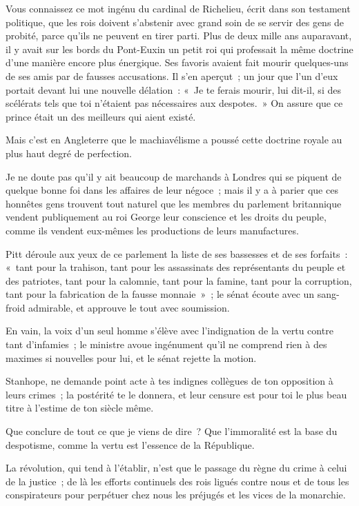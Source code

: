 \documentclass[french,twoside]{book} %
\begin{document}
Vous connaissez ce mot ingénu du cardinal de Richelieu, écrit dans son testament politique, que les rois doivent s’abstenir avec grand soin de se servir des gens de probité, parce qu’ils ne peuvent en tirer parti. Plus de deux mille ans auparavant, il y avait sur les bords du Pont-Euxin un petit roi qui professait la même doctrine d’une manière encore plus énergique. Ses favoris avaient fait mourir quelques-uns de ses amis par de fausses accusations. Il s’en aperçut ; un jour que l’un d’eux portait devant lui une nouvelle délation : « Je te ferais mourir, lui dit-il, si des scélérats tels que toi n’étaient pas nécessaires aux despotes. » On assure que ce prince était un des meilleurs qui aient existé.\par
Mais c’est en Angleterre que le machiavélisme a poussé cette doctrine royale au plus haut degré de perfection.\par
Je ne doute pas qu’il y ait beaucoup de marchands à Londres qui se piquent de quelque bonne foi dans les affaires de leur négoce ; mais il y a à parier que ces honnêtes gens trouvent tout naturel que les membres du parlement britannique vendent publiquement au roi George leur conscience et les droits du peuple, comme ils vendent eux-mêmes les productions de leurs manufactures.\par
Pitt déroule aux yeux de ce parlement la liste de ses bassesses et de ses forfaits : « tant pour la trahison, tant pour les assassinats des représentants du peuple et des patriotes, tant pour la calomnie, tant pour la famine, tant pour la corruption, tant pour la fabrication de la fausse monnaie » ; le sénat écoute avec un sang-froid admirable, et approuve le tout avec soumission.\par
En vain, la voix d’un seul homme s’élève avec l’indignation de la vertu contre tant d’infamies ; le ministre avoue ingénument qu’il ne comprend rien à des maximes si nouvelles pour lui, et le sénat rejette la motion.\par
Stanhope, ne demande point acte à tes indignes collègues de ton opposition à leurs crimes ; la postérité te le donnera, et leur censure est pour toi le plus beau titre à l’estime de ton siècle même.\par
Que conclure de tout ce que je viens de dire ? Que l’immoralité est la base du despotisme, comme la vertu est l’essence de la République.\par
La révolution, qui tend à l’établir, n’est que le passage du règne du crime à celui de la justice ; de là les efforts continuels des rois ligués contre nous et de tous les conspirateurs pour perpétuer chez nous les préjugés et les vices de la monarchie.\par
\end{document}
